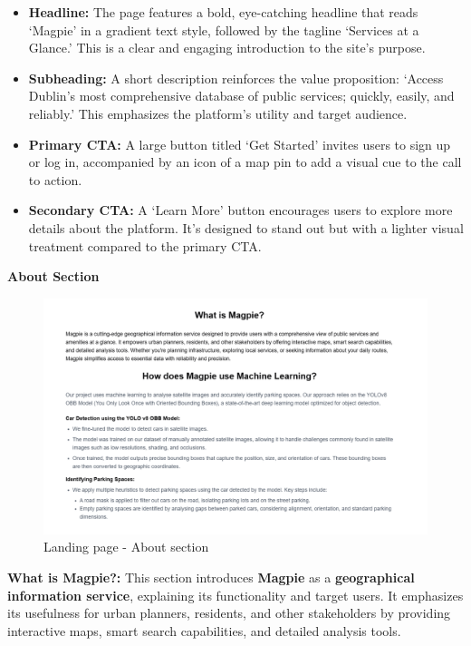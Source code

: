 \begin{itemize}
    \item{} \textbf{Headline:} The page features a bold, eye{-}catching headline that reads `Magpie' in a gradient text style, followed by the tagline `Services at a Glance.' This is a clear and engaging introduction to the site's purpose.
    \item{} \textbf{Subheading:} A short description reinforces the value proposition: `Access Dublin's most comprehensive database of public services; quickly, easily, and reliably.' This emphasizes the platform's utility and target audience.
    \item{} \textbf{Primary CTA:} A large button titled `Get Started' invites users to sign up or log in, accompanied by an icon of a map pin to add a visual cue to the call to action.
    \item{} \textbf{Secondary CTA:} A `Learn More' button encourages users to explore more details about the platform. It’s designed to stand out but with a lighter visual treatment compared to the primary CTA\@.
\end{itemize}

\newpage{}

\textbf{About Section}

\begin{figure}[h]
    \centering{}
    \includegraphics[width=1\textwidth]{images/site/landing/landing_2_about.png}
    \caption{Landing page {-} About section}
\end{figure}

\textbf{What is Magpie?:} This section introduces \textbf{Magpie} as a \textbf{geographical information service}, explaining its functionality and target users. It emphasizes its usefulness for urban planners, residents, and other stakeholders by providing interactive maps, smart search capabilities, and detailed analysis tools.

